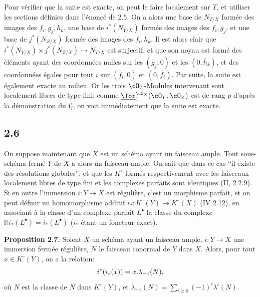 Pour vérifier que la suite est exacte, on peut le faire localement sur \(T\), et utiliser les sections définies dans l'énoncé de 2.5. On a alors une base de \(N_{T/X}\) formée des images des \(f_i,g_j,h_k\), une base de \(i^*(N_{Y/X})\) formée des images des \(f_i,g_j\), et une base de \(j^*(N_{Z/X})\) formée des images des \(f_i,h_k\). Il est alors clair que \(i^*(N_{Y/X})\times j^*(N_{Z/X})\to N_{T/X}\) est surjectif, et que son noyau est formé des éléments ayant des coordonnées nulles sur les \((\overline g_j,0)\) et les \((0,\overline h_k)\), et des coordonnées égales pour tout \(i\) sur \((\overline f_i,0)\) et \((0,\overline f_i)\). Par suite, la suite est également exacte au milieu. Or les trois \(\cO_T\)-Modules intervenant sont localement libres de type fini; comme \(\underline{\Tor}_1^{\cO_X}(\cO_Y,\cO_Z)\) est de rang \(p\) d'après la démonstration du i), on voit immédiatement que la suite est exacte.

\subsection*{2.6}
On suppose maintenant que \(X\) est un schéma ayant un faisceau ample. Tout sous-schéma fermé \(Y\) de \(X\) a alors un faisceau ample. On sait que dans ce cas ``il existe des résolutions globales'', et que les \(K^\circ\) formés respectivement avec les faisceaux localement libres de type fini et les complexes parfaits sont identiques (II, 2.2.9). Si en outre l'immersion \(i:Y\to X\) est régulière, c'est un morphisme parfait, et on peut définir un homomorphisme additif \(i_*:K^\circ(Y)\longrightarrow K^\circ(X)\) (IV 2.12), en associant à la classe d'un complexe parfait \(L^\bullet\) la classe du complexe \(\mathbb Ri_*(L^\bullet)=i_*(L^\bullet)\) (\(i_*\) étant un foncteur exact).

\textbf{Proposition 2.7.} Soient \(X\) un schéma ayant un faisceau ample, \(i:Y\to X\) une immersion fermée régulière, \(N\) le faisceau conormal de \(Y\) dans \(X\). Alors, pour tout \(x\in K^\circ(Y)\), on a la relation:
\begin{equation}\notag
i^*(i_*(x))=x.\lambda_{-1}(N),
\end{equation}
où \(N\) est la classe de \(N\) dans \(K^\circ(Y)\), et \(\lambda_{-1}(N)=\sum_{i\ge0}(-1)^i\lambda^i(N)\).



